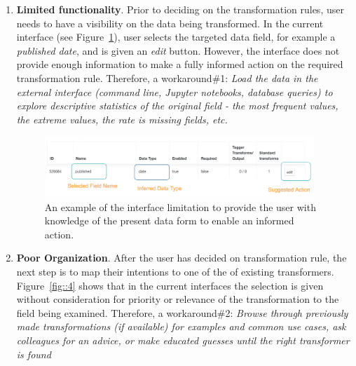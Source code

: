 \documentclass[12pt,letterpaper]{article}
\begin{document}
\begin{enumerate}
    \item \textbf{Limited functionality}. Prior to deciding on the transformation rules, user needs to have a visibility on the data being transformed. In the current interface (see Figure~\ref{fig::3}), user selects the targeted data field, for example a \textit{published date}, and is given an \textit{edit} button. However, the interface does not provide enough information to make a fully informed action on the required transformation rule. Therefore, a workaround\#1:  
    \textit{Load the data in the external interface (command line, Jupyter notebooks, database queries) to explore descriptive statistics of the original field - the most frequent values,  the extreme values, the rate is missing fields, etc.}
    
    \begin{figure}[h]
    \centering
    \includegraphics[width=4in, scale=.4]{DataVisibility.png}
    \caption{An example of the interface limitation to provide the user with knowledge of the present data form to enable an informed action.}
    \label{fig::3}
    \end{figure}
    
    
    \item \textbf{Poor Organization}. After the user has decided on transformation rule, the next step is to map their intentions to one of the of existing transformers. Figure~\ref{fig::4} shows that in the current interfaces the selection is given without consideration for priority or relevance of the transformation to the field being examined. Therefore, a workaround\#2:
    \textit{Browse through previously made transformations (if available) for examples and common use cases, ask colleagues for an advice, or make educated guesses until the right transformer is found}
    

\end{enumerate}
\end{document}
